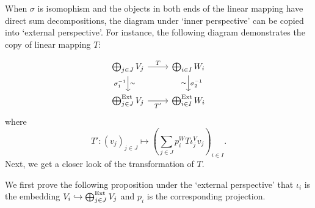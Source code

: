 When $\sigma$ is isomophism and the objects in both ends of the linear mapping have direct sum decompositions, the diagram under `inner perspective' can be copied into `external perspective'. For instance, the following diagram demonstrates the copy of linear mapping $T$:

\[
    \begin{tikzcd}
        \bigoplus_{j \in J} V_j  \arrow[r, "T"]  \arrow[d, "\sigma_{1}^{-1}"', "\sim"]
        &
        \bigoplus_{i \in I} W_i \arrow[d, "\sigma_{2}^{-1}", "\sim"']
        \\
        \bigoplus_{j \in J}^{\Ext} V_j \arrow[r, "T'"'] 
        & \bigoplus_{i \in I}^{\Ext} W_i 
    \end{tikzcd}
\]
where
\[
    T' : (v_j)_{j \in J} \mapsto \left( \sum_{j \in J} p_i^{W} T \iota_j^{V} v_j \right)_{i \in I}.
\]
Next, we get a closer look of the transformation of $T$.







We first prove the following proposition under the `external perspective' that $\iota_i$ is the embedding $V_i \hookrightarrow \bigoplus^{\mathrm{Ext}}_{j \in J} V_j$ and $p_i$ is the corresponding projection.


